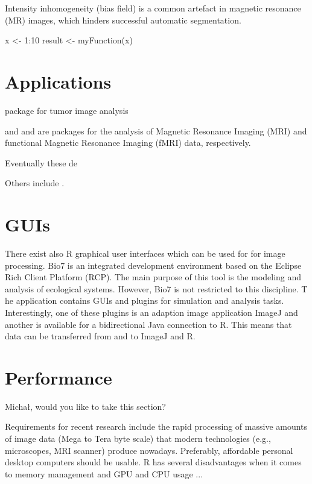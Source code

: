 Intensity inhomogeneity (bias field) is a common artefact in 
magnetic resonance (MR) images, which hinders successful automatic segmentation. \citep{ivanovska_efficient_2016}


\begin{example}
  x <- 1:10
  result <- myFunction(x)
\end{example}


\section{Applications}

 package \citep{failmezger_crimage:_2012} for tumor image analysis

 \citep{marchini_analyzefmri:_2002} and  
\citep{polzehl_fmri:_2007} and are packages for the analysis of Magnetic 
Resonance Imaging (MRI) and functional Magnetic Resonance Imaging (fMRI) data, 
respectively.

Eventually these de 

Others include  \citep{dunning_beadarray:_2006, frery_introduction_2013}.

\section{GUIs}

There exist also R graphical user interfaces \citep{rodiger_rkward:_2012} which can be used for for image processing. 
Bio7 is an integrated development environment based on the Eclipse Rich Client 
Platform (RCP). The main purpose of this tool is the modeling and analysis of 
ecological systems. However, Bio7 is not restricted to this discipline. T
he application contains GUIs and plugins for simulation and analysis tasks. 
Interestingly, one of these plugins is an adaption image application ImageJ 
and another is available for a bidirectional Java connection to R. This 
means that data can be transferred from and to ImageJ and R.



\section{Performance}

Micha\l{}, would you like to take this section?


Requirements for recent research include the rapid processing of massive amounts 
of image data (Mega to Tera byte scale) that modern technologies (e.g., 
microscopes, MRI scanner) produce nowadays. Preferably, affordable personal desktop
computers should be usable. R has several disadvantages when it comes to memory management
and GPU and CPU usage ...


